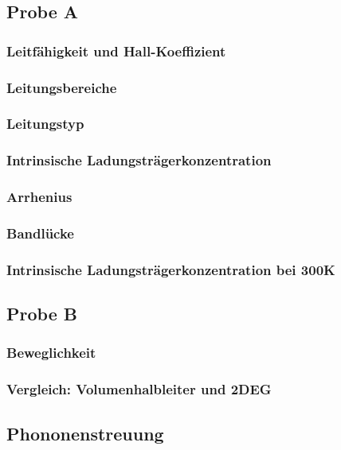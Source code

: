 \subsection{Probe A}
\subsubsection{Leitfähigkeit und Hall-Koeffizient}


\subsubsection{Leitungsbereiche}



\subsubsection{Leitungstyp}

\subsubsection{Intrinsische Ladungsträgerkonzentration}

\subsubsection{Arrhenius}

\subsubsection{Bandlücke}

\subsubsection{Intrinsische Ladungsträgerkonzentration bei 300K}

\subsection{Probe B}
\subsubsection{Beweglichkeit}

\subsubsection{Vergleich: Volumenhalbleiter und 2DEG}

\subsection{Phononenstreuung}



